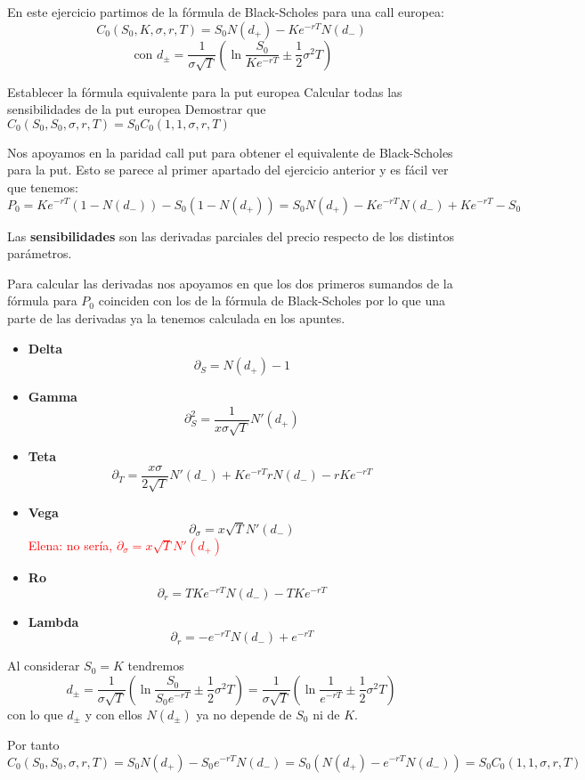 \begin{problem}[2]
En este ejercicio partimos de la fórmula de Black-Scholes para una call europea:
\[C_0(S_0,K,σ,r,T)=S_0N(d_+)-Ke^{-rT}N(d_-) \]
\[\text{   con } d_{\pm} = \frac{1}{σ\sqrt{T}}\left( \ln \frac{S_0}{Ke^{-rT}}\pm \frac{1}{2}σ^2T\right)\]

\ppart Establecer la fórmula equivalente para la put europea
\ppart Calcular todas las sensibilidades de la put europea
\ppart Demostrar que $C_0(S_0,S_0,σ,r,T)=S_0C_0(1,1,σ,r,T)$
\solution
{}

\spart

Nos apoyamos en la paridad call put para obtener el equivalente de Black-Scholes para la put. Esto se parece al primer apartado del ejercicio anterior y es fácil ver que tenemos:
\[P_0 = Ke^{-rT}(1-N(d_-))-S_0(1-N(d_+)) = S_0N(d_+) -Ke^{-rT}N(d_-)+Ke^{-rT} -S_0 \]

\spart

Las \textbf{sensibilidades} son las derivadas parciales del precio respecto de los distintos parámetros.

Para calcular las derivadas nos apoyamos en que los dos primeros sumandos de la fórmula para $P_0$ coinciden con los de la fórmula de Black-Scholes por lo que una parte de las derivadas ya la tenemos calculada en los apuntes.
\begin{itemize}
\item \textbf{Delta}
\[\partial_S = N(d_+)-1\]
\item \textbf{Gamma}
\[\partial^2_S = \frac{1}{xσ\sqrt{T}}N'(d_+)\]
\item \textbf{Teta}
\[\partial_T = \frac{xσ}{2\sqrt{T}}N'(d_-) + Ke^{-rT}rN(d_-)-rKe^{-rT}\]
\item \textbf{Vega}\\
\[\partial_σ = x\sqrt{T}N'(d_{-}) \]
\textcolor{red}{Elena: no sería, $\partial_σ = x\sqrt{T}N'(d_{+}) $}
\item \textbf{Ro}\\
\[\partial_r = TKe^{-rT}N(d_-)-TKe^{-rT}\]
\item \textbf{Lambda}\\
\[\partial_r = -e^{-rT}N(d_-)+e^{-rT}\]
\end{itemize}

\spart

Al considerar $S_0=K$ tendremos
\[d_{\pm} = \frac{1}{σ\sqrt{T}}\left( \ln \frac{S_0}{S_0e^{-rT}}\pm \frac{1}{2}σ^2T\right)  = \frac{1}{σ\sqrt{T}}\left( \ln \frac{1}{e^{-rT}}\pm \frac{1}{2}σ^2T\right)\]
con lo que $d_{\pm}$ y con ellos $N(d_{\pm})$ ya no depende de $S_0$ ni de $K$.

Por tanto
\[C_0(S_0,S_0,σ,r,T) = S_0N(d_+)-S_0e^{-rT}N(d_-) = S_0\left(N(d_+)-e^{-rT}N(d_-) \right) = S_0 C_0(1,1,σ,r,T)\]
\end{problem}

